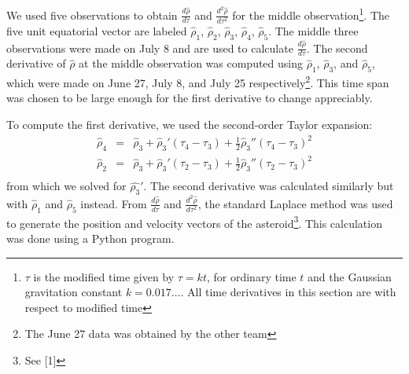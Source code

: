 \documentclass[12pt,journal,compsoc]{IEEEtran}
\begin{document}
We used five observations to obtain $\frac{d\hat{\rho}}{d\tau}$ and $\frac{d^2\hat{\rho}}{d\tau^2}$ for the middle observation\footnote{$\tau$ is the modified time given by $\tau=kt$, for ordinary time $t$ and the Gaussian gravitation constant $k=0.017...$.
All time derivatives in this section are with respect to modified time}. 
The five unit equatorial vector are labeled $\hat{\rho}_1$, $\hat{\rho}_2$, $\hat{\rho}_3$, $\hat{\rho}_4$, $\hat{\rho}_5$. The middle three observations were made on July 8 and are used to calculate $\frac{d\hat{\rho}}{d\tau}$.
The second derivative of $\hat{\rho}$ at the middle observation was  computed using  $\hat{\rho}_1$, $\hat{\rho}_3$, and  $\hat{\rho}_5$, which were made on June 27, July 8, and July 25 respectively\footnote{The June 27 data was obtained by the other team}.
This time span was chosen to be large enough for the first derivative to change appreciably.

To compute the first derivative, we used the second-order Taylor expansion:
\begin{eqnarray*}
\hat{\rho}_4&=&\hat{\rho}_3+\hat{\rho}_3' (\tau_4-\tau_3)+\frac{1}{2}\hat{\rho}_3'' (\tau_4-\tau_3)^2\\
\hat{\rho}_2&=&\hat{\rho}_3+\hat{\rho}_3' (\tau_2-\tau_3)+\frac{1}{2}\hat{\rho}_3'' (\tau_2-\tau_3) ^2\\
\end{eqnarray*}
from which we solved for $\hat{\rho_3}'$.
The second derivative was calculated similarly but with   $\hat{\rho}_1$ and $\hat{\rho}_5$ instead.
From $\frac{d\hat{\rho}}{d\tau}$ and $\frac{d^2\hat{\rho}}{d\tau^2}$, the standard Laplace method was used to generate the position and velocity vectors of the asteroid\footnote{See [1]}.
This calculation was done using a Python program.
\end{document}
